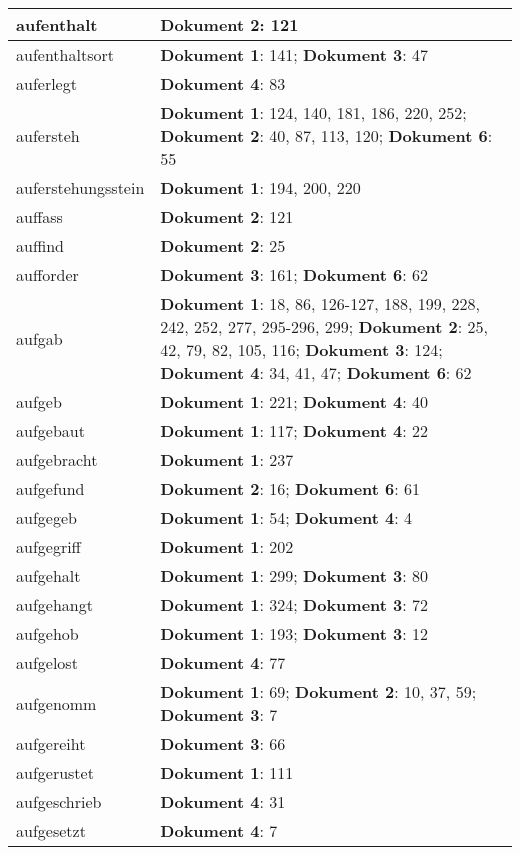 \documentclass[a5paper]{article}
\begin{document}
\begin{longtable}[l]{|l|p{3in}|}
\hline
aufenthalt & \textbf{Dokument 2}: 121 \\
\hline
aufenthaltsort & \textbf{Dokument 1}: 141; \textbf{Dokument 3}: 47 \\
\hline
auferlegt & \textbf{Dokument 4}: 83 \\
\hline
aufersteh & \textbf{Dokument 1}: 124, 140, 181, 186, 220, 252; \textbf{Dokument 2}: 40, 87, 113, 120; \textbf{Dokument 6}: 55 \\
\hline
auferstehungsstein & \textbf{Dokument 1}: 194, 200, 220 \\
\hline
auffass & \textbf{Dokument 2}: 121 \\
\hline
auffind & \textbf{Dokument 2}: 25 \\
\hline
aufforder & \textbf{Dokument 3}: 161; \textbf{Dokument 6}: 62 \\
\hline
aufgab & \textbf{Dokument 1}: 18, 86, 126-127, 188, 199, 228, 242, 252, 277, 295-296, 299; \textbf{Dokument 2}: 25, 42, 79, 82, 105, 116; \textbf{Dokument 3}: 124; \textbf{Dokument 4}: 34, 41, 47; \textbf{Dokument 6}: 62 \\
\hline
aufgeb & \textbf{Dokument 1}: 221; \textbf{Dokument 4}: 40 \\
\hline
aufgebaut & \textbf{Dokument 1}: 117; \textbf{Dokument 4}: 22 \\
\hline
aufgebracht & \textbf{Dokument 1}: 237 \\
\hline
aufgefund & \textbf{Dokument 2}: 16; \textbf{Dokument 6}: 61 \\
\hline
aufgegeb & \textbf{Dokument 1}: 54; \textbf{Dokument 4}: 4 \\
\hline
aufgegriff & \textbf{Dokument 1}: 202 \\
\hline
aufgehalt & \textbf{Dokument 1}: 299; \textbf{Dokument 3}: 80 \\
\hline
aufgehangt & \textbf{Dokument 1}: 324; \textbf{Dokument 3}: 72 \\
\hline
aufgehob & \textbf{Dokument 1}: 193; \textbf{Dokument 3}: 12 \\
\hline
aufgelost & \textbf{Dokument 4}: 77 \\
\hline
aufgenomm & \textbf{Dokument 1}: 69; \textbf{Dokument 2}: 10, 37, 59; \textbf{Dokument 3}: 7 \\
\hline
aufgereiht & \textbf{Dokument 3}: 66 \\
\hline
aufgerustet & \textbf{Dokument 1}: 111 \\
\hline
aufgeschrieb & \textbf{Dokument 4}: 31 \\
\hline
aufgesetzt & \textbf{Dokument 4}: 7 \\

\end{longtable}
\end{document}
